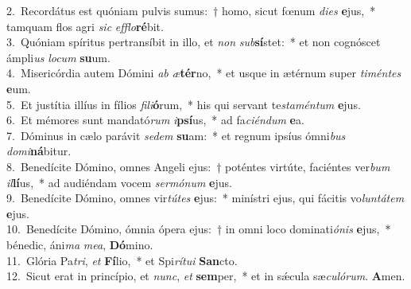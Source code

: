 {2.~}Recordátus est quóniam pulvis sumus:~† homo, sicut fœnum \textit{di}\textit{es} \textbf{e}jus,~* tamquam flos agri \textit{sic} \textit{ef}\textit{flo}\textbf{ré}bit.\\
{3.~}Quóniam spíritus pertransíbit in illo, et \textit{non} \textit{sub}\textbf{sí}stet:~* et non cognóscet ámpli\textit{us} \textit{lo}\textit{cum} \textbf{su}um.\\
{4.~}Misericórdia autem Dómini \textit{ab} \textit{æ}\textbf{tér}no,~* et usque in ætérnum super \textit{ti}\textit{mén}\textit{tes} \textbf{e}um.\\
{5.~}Et justítia illíus in fílios \textit{fi}\textit{li}\textbf{ó}rum,~* his qui servant te\textit{sta}\textit{mén}\textit{tum} \textbf{e}jus.\\
{6.~}Et mémores sunt mandató\textit{rum} \textit{i}\textbf{psí}us,~* ad fa\textit{ci}\textit{én}\textit{dum} \textbf{e}a.\\
{7.~}Dóminus in cælo parávit \textit{se}\textit{dem} \textbf{su}am:~* et regnum ipsíus ómni\textit{bus} \textit{do}\textit{mi}\textbf{ná}bitur.\\
{8.~}Benedícite Dómino, omnes Angeli ejus:~† poténtes virtúte, faciéntes ver\textit{bum} \textit{il}\textbf{lí}us,~* ad audiéndam vocem \textit{ser}\textit{mó}\textit{num} \textbf{e}jus.\\
{9.~}Benedícite Dómino, omnes vir\textit{tú}\textit{tes} \textbf{e}jus:~* minístri ejus, qui fácitis vo\textit{lun}\textit{tá}\textit{tem} \textbf{e}jus.\\
{10.~}Benedícite Dómino, ómnia ópera ejus:~† in omni loco dominati\textit{ó}\textit{nis} \textbf{e}jus,~* bénedic, áni\textit{ma} \textit{me}\textit{a}, \textbf{Dó}mino.\\
{11.~}Glória Pa\textit{tri}, \textit{et} \textbf{Fí}lio,~* et Spi\textit{rí}\textit{tu}\textit{i} \textbf{San}cto.\\
{12.~}Sicut erat in princípio, et \textit{nunc}, \textit{et} \textbf{sem}per,~* et in sǽcula sæ\textit{cu}\textit{ló}\textit{rum}. \textbf{A}men.\\

